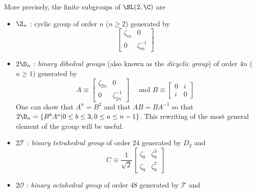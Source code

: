 \documentclass{worksheetclass}
\begin{document}
            More precisely, the finite subgroups of $\SL(2,\C)$ are
            \begin{itemize}
                \item $\Z_n$ : cyclic group of order $n$ ($n\geq2$) generated by
                \begin{equation}
                    \begin{bmatrix}
                        \zeta_m & 0\\
                        0 & \zeta^{-1}_m
                    \end{bmatrix}
                \end{equation}
                \item $2\D_n$ : \emph{binary dihedral groups} (also known as the \emph{dicyclic group}) of order $4n$ ($n\geq1$) generated by
                \begin{equation}
                    A \equiv
                    \begin{bmatrix}
                        \zeta_{2n} & 0\\
                        0 & \zeta^{-1}_{2n}
                    \end{bmatrix}\quad \text{ and }
                    B \equiv 
                    \begin{bmatrix}
                        0 & i\\
                        i & 0
                    \end{bmatrix}
                \end{equation}
                One can show that $A^n=B^2$ and that $AB=BA^{-1}$ so that $2\D_n=\{B^bA^a|0\leq b \leq 3, 0\leq a \leq n-1\}$. This rewriting of the most general element of the group will be useful.
                \item $2\mathcal{T}$ : \emph{binary tetrahedral group} of order $24$ generated by $D_2$ and
                \begin{equation}
                    C \equiv \frac{1}{\sqrt{2}}
                    \begin{bmatrix}
                        \zeta_8 & \zeta^3_8\\
                        \zeta_8 & \zeta^7_8
                    \end{bmatrix}
                \end{equation}
                \item $2\mathcal{O}$ : \emph{binary octahedral group} of order $48$ generated by $\mathcal{T}$ and
                \begin{equation}

\end{equation}
\end{itemize}
\end{document}
